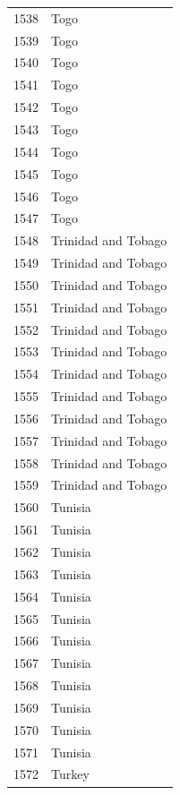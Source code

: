 \documentclass[
  letterpaper,
  DIV=11,
  numbers=noendperiod]{scrreprt}
\begin{document}
\begin{tabular}{ll}
1538 &                      Togo \\
1539 &                      Togo \\
1540 &                      Togo \\
1541 &                      Togo \\
1542 &                      Togo \\
1543 &                      Togo \\
1544 &                      Togo \\
1545 &                      Togo \\
1546 &                      Togo \\
1547 &                      Togo \\
1548 &       Trinidad and Tobago \\
1549 &       Trinidad and Tobago \\
1550 &       Trinidad and Tobago \\
1551 &       Trinidad and Tobago \\
1552 &       Trinidad and Tobago \\
1553 &       Trinidad and Tobago \\
1554 &       Trinidad and Tobago \\
1555 &       Trinidad and Tobago \\
1556 &       Trinidad and Tobago \\
1557 &       Trinidad and Tobago \\
1558 &       Trinidad and Tobago \\
1559 &       Trinidad and Tobago \\
1560 &                   Tunisia \\
1561 &                   Tunisia \\
1562 &                   Tunisia \\
1563 &                   Tunisia \\
1564 &                   Tunisia \\
1565 &                   Tunisia \\
1566 &                   Tunisia \\
1567 &                   Tunisia \\
1568 &                   Tunisia \\
1569 &                   Tunisia \\
1570 &                   Tunisia \\
1571 &                   Tunisia \\
1572 &                    Turkey \\

\end{tabular}
\end{document}
